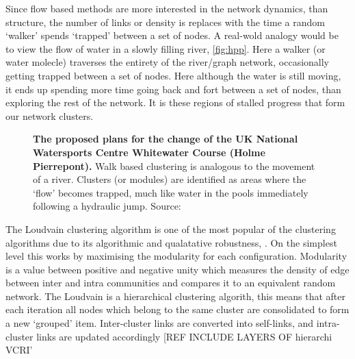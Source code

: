 Since flow based methods are more interested in the network dynamics, than structure, the number of links or density is replaces with the time a random `walker' spends `trapped' between a set of nodes. A real-wold analogy would be to view the flow of water in a slowly filling river, \autoref{fig:hpp}. Here a walker (or water molecle) traverses the entirety of the river/graph network, occasionally getting trapped between a set of nodes. Here although the water is still moving, it ends up spending more time going back and fort between a set of nodes, than exploring the rest of the network. It is these regions of stalled progress that form our network clusters.  

\begin{figure}[H]
    \centering 
\caption{\textbf{The proposed plans for the change of the UK National Watersports Centre Whitewater Course (Holme Pierrepont).} Walk based clustering is analogous to the movement of a river. Clusters (or modules) are identified as areas where the `flow' becomes trapped, much like water in the pools immediately following a hydraulic jump. Source: \cite{hpp} }\label{fig:hpp}
\end{figure}

The Loudvain clustering algorithm is one of the most popular of the clustering algorithms due to its algorithmic and qualatative robustness, \citep{loudvain,loudrobust}. On the simplest level this works by maximising the modularity for each configuration. Modularity is a value between positive and negative unity which measures the density of edge between inter and intra communities and compares it to an equivalent random network.
The Loudvain is a hierarchical clustering algorith, this means that after each iteration all nodes which belong to the same cluster are consolidated to form a new `grouped' item. Inter-cluster links are converted into self-links, and intra-cluster links are updated accordingly [REF INCLUDE LAYERS OF hierarchi VCRI'

